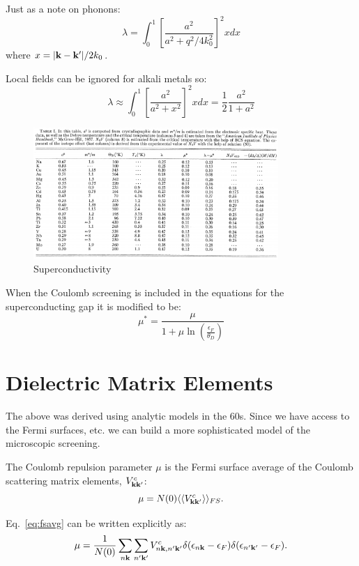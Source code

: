 Just as a note on phonons:
%
\begin{equation}
\lambda = \int_{0}^{1}\left[ \frac{a^{2}}{a^{2} + q^{2}/4k^{2}_{0}}\right]^{2} x dx
\end{equation}
%
where $x=|{\bf k}-{\bf k}'|/2k_{0}$.

Local fields can be ignored for alkali metals so:
%
\begin{equation}
\lambda \approx \int_{0}^{1} \left[\frac{a^{2}}{a^{2}+x^{2}}\right]^{2}x dx=\frac{1}{2}\frac{a^{2}}{1+a^{2}}
\end{equation}
%
\begin{figure}
\label{fig:supercond}
\begin{center}
\includegraphics[height=50mm]{./Superconductivity/superconductingparameters.png}
\caption{\small Superconductivity}
\end{center}
\end{figure}
%
When the Coulomb screening is included in the equations for the 
superconducting gap it is modified to be:
%
\begin{equation}
\mu^{*} =  \frac{\mu}{1+ \mu \ln(\frac{\epsilon_{F}}{\theta_{D}})}
\end{equation}
%
\section{Dielectric Matrix Elements}
The above was derived using analytic models in the 60s. Since we have access
to the Fermi surfaces, etc. we can build a more sophisticated model of the
microscopic screening.

The Coulomb repulsion parameter $\mu$ is the Fermi surface average of the Coulomb
scattering matrix elements, $V^{c}_{{\bf k}{\bf k}'}$:
%
\begin{equation}
\label{eq:fsavg}
\mu = N(0) \langle\langle V^{c}_{{\bf k}{\bf k}'} \rangle\rangle_{FS}.
\end{equation}
%

Eq.~\ref{eq:fsavg} can be written explicitly as:
%
\begin{equation}
\mu = \frac{1}{N(0)} \sum_{n{\bf k}}\sum_{n'{\bf k}'}V^{c}_{n{\bf k},n'{\bf k}'}\delta(\epsilon_{n{\bf k}}-\epsilon_{F})\delta(\epsilon_{n'{\bf k}'}-\epsilon_{F}).
\end{equation}
%

